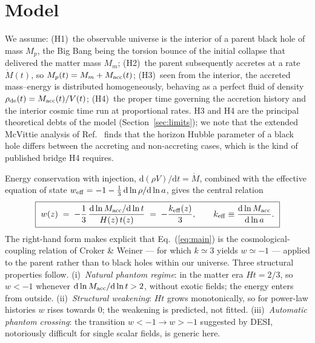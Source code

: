 \documentclass[11pt]{article}
\newcommand{\Macc}{M_{\rm acc}}
\newcommand{\keff}{k_{\rm eff}}
\begin{document}
\section{Model}
\label{sec:model}
We assume: (H1)~the observable universe is the interior of a parent black hole of mass $M_p$, the Big Bang being the torsion bounce of the initial collapse that delivered the matter mass $M_m$; (H2)~the parent subsequently accretes at a rate $\dot M(t)$, so $M_p(t) = M_m + \Macc(t)$; (H3)~seen from the interior, the accreted mass--energy is distributed homogeneously, behaving as a perfect fluid of density $\rho_{\rm de}(t) = \Macc(t)/V(t)$; (H4)~the proper time governing the accretion history and the interior cosmic time run at proportional rates. H3 and H4 are the principal theoretical debts of the model (Section~\ref{sec:limits}); we note that the extended McVittie analysis of Ref.~\cite{Poplawski2024} finds that the horizon Hubble parameter of a black hole differs between the accreting and non-accreting cases, which is the kind of published bridge H4 requires.

Energy conservation with injection, $\mathrm{d}(\rho V)/\mathrm{d}t = \dot M$, combined with the effective equation of state $w_{\rm eff} = -1 - \tfrac{1}{3}\,\mathrm{d}\ln\rho/\mathrm{d}\ln a$, gives the central relation
\begin{equation}
\boxed{\ w(z) \;=\; -\frac{1}{3}\,\frac{\mathrm{d}\ln \Macc/\mathrm{d}\ln t}{H(z)\,t(z)} \;=\; -\frac{\keff(z)}{3}, \qquad \keff \equiv \frac{\mathrm{d}\ln \Macc}{\mathrm{d}\ln a}.\ }
\label{eq:main}
\end{equation}
The right-hand form makes explicit that Eq.~(\ref{eq:main}) is the cosmological-coupling relation of Croker \& Weiner \cite{CrokerWeiner2019} --- for which $k \simeq 3$ yields $w \simeq -1$ --- applied to the parent rather than to black holes within our universe. Three structural properties follow. (i)~\emph{Natural phantom regime}: in the matter era $Ht = 2/3$, so $w < -1$ whenever $\mathrm{d}\ln\Macc/\mathrm{d}\ln t > 2$, without exotic fields; the energy enters from outside. (ii)~\emph{Structural weakening}: $Ht$ grows monotonically, so for power-law histories $w$ rises towards $0$; the weakening is predicted, not fitted. (iii)~\emph{Automatic phantom crossing}: the transition $w<-1 \to w>-1$ suggested by DESI, notoriously difficult for single scalar fields, is generic here.
\end{document}
